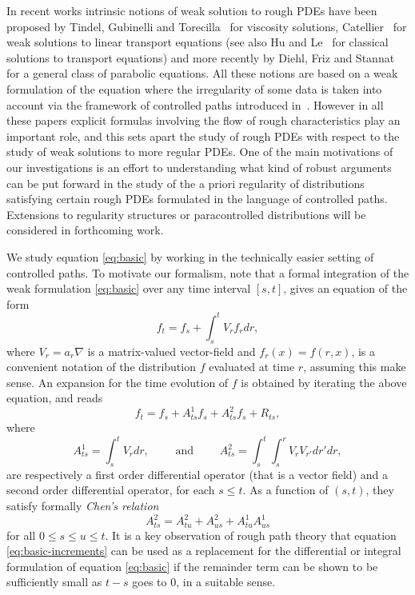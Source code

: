 \documentclass[11pt,a4paper]{amsart}
\renewcommand{\leq}{\leqslant}
\newcommand{\ssk}{\smallskip}
\numberwithin{equation}{section} %
\begin{document}
\ssk

In recent works intrinsic notions of weak solution to rough PDEs have been proposed by Tindel, Gubinelli and Torecilla~\cite{GTT} for viscosity solutions,  Catellier~\cite{CatellierTransport} for weak solutions to linear transport equations (see also Hu and Le~\cite{HuLe} for classical solutions to transport equations) and more recently by Diehl, Friz and Stannat~\cite{DiehlFrizStannat} for a general class of parabolic equations. All these notions are based on a weak formulation of the equation where the irregularity of some data is taken into account via the framework of controlled paths introduced in~\cite{Gubinelli04}. However in all these papers explicit formulas involving the flow of rough characteristics play an important role, and this sets apart the study of rough PDEs with respect to the study of weak solutions to more regular PDEs. One of the main motivations of our investigations is an effort to understanding what kind of robust arguments can be put forward in the study of the a priori regularity of distributions satisfying certain rough PDEs formulated in the language of controlled paths. Extensions to regularity structures or paracontrolled distributions will be considered in forthcoming work. 

\bigskip

We study equation \eqref{eq:basic} by working in the technically easier setting of controlled paths. To motivate our formalism, note that a formal integration of the weak formulation \eqref{eq:basic} over any time interval $[s,t]$, gives an equation of the form
$$
f_t = f_s + \int_s^t V_r f_r dr, 
$$ 
where $V_r = a_r\nabla$ is a matrix-valued vector-field and $f_r(x) = f(r,x)$, is a convenient notation of the distribution $f$ evaluated at time $r$, assuming this make sense. An expansion for the time evolution of $f$ is obtained by iterating the above equation, and reads
\begin{equation}
\label{eq:basic-increments}
f_t = f_s + A^1_{ts} f_s + A^2_{ts} f_s + R_{ts},
\end{equation}
where
$$
A^1_{ts} = \int_s^t V_r  dr,\qquad\textrm{ and }\qquad A^2_{ts} = \int_s^t \int_s^r V_r V_{r'} dr' dr,
$$
are respectively a first order differential operator (that is a vector field) and a second order differential operator, for each $s\leq t$. As a function of $(s,t)$, they satisfy formally \textit{Chen's relation}
\begin{equation}
\label{eq:operator-chen}
A^2_{ts} =A^2_{tu}+ A^2_{us} + A^{1}_{tu}A^{1}_{us}
\end{equation}
for all $0\leq s \leq u \leq t$. It is a key observation of rough path theory that equation \eqref{eq:basic-increments} can be used as a replacement for the differential or integral formulation 
of equation \eqref{eq:basic} if the remainder term can be shown to be sufficiently small as $t-s$ goes to $0$, in a suitable sense.
\end{document}
